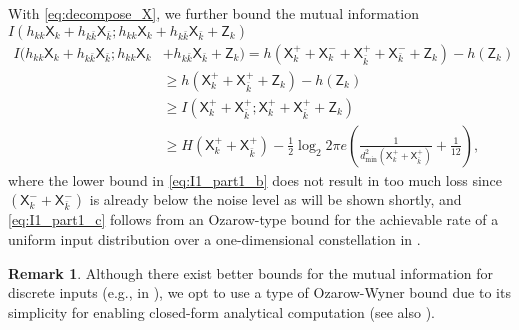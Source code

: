 \documentclass[12pt, draftclsnofoot, onecolumn]{IEEEtran}
\newcommand{\msf}[1]{\mathsf{#1}}
\theoremstyle{definition}
\newtheorem{remark}{Remark}
\begin{document}
With \eqref{eq:decompose_X}, we further bound the mutual information $I(h_{kk}\msf{X}_k+h_{k\bar{k}}\msf{X}_{\bar{k}};h_{kk}\msf{X}_k+h_{k\bar{k}}\msf{X}_{\bar{k}}+\msf{Z}_k)$
\begin{subequations}\label{eq:I1_part1}
\begin{align}
I(h_{kk}\msf{X}_k+h_{k\bar{k}}\msf{X}_{\bar{k}};h_{kk}\msf{X}_k&+h_{k\bar{k}}\msf{X}_{\bar{k}}+\msf{Z}_k)
= h(\msf{X}_k^{+}+\msf{X}_k^{-}+\msf{X}_{\bar{k}}^{+}+\msf{X}_{\bar{k}}^{-}+\msf{Z}_k)-h(\msf{Z}_k)  \\
&\geq h(\msf{X}_k^{+}+\msf{X}_{\bar{k}}^{+}+\msf{Z}_k)-h(\msf{Z}_k) \label{eq:I1_part1_b} \\
&\geq I(\msf{X}_k^{+}+\msf{X}_{\bar{k}}^{+};\msf{X}_k^{+}+\msf{X}_{\bar{k}}^{+}+\msf{Z}_k)  \\
&\geq H(\msf{X}_k^{+}+\msf{X}_{\bar{k}}^{+}) - \frac{1}{2}\log_2 2\pi e \left(\frac{1}{ d^2_{\min}(\msf{X}_k^{+}+\msf{X}_{\bar{k}}^{+})} + \frac{1}{12}\right), \label{eq:I1_part1_c}
\end{align}
\end{subequations}
where the lower bound in \eqref{eq:I1_part1_b} does not result in too much loss since $(\msf{X}_{k}^{-}+\msf{X}_{\bar{k}}^{-})$ is already below the noise level as will be shown shortly, and \eqref{eq:I1_part1_c} follows from an Ozarow-type bound \cite{ozarow90} for the achievable rate of a uniform input distribution over a one-dimensional constellation in \cite[Prop. 1]{7451210}.






\begin{remark}
Although there exist better bounds for the mutual information for discrete inputs (e.g., in \cite{7451210}), we opt to use a type of Ozarow-Wyner bound \cite{ozarow90} due to its simplicity for enabling closed-form analytical computation (see also \cite[Sec. II-A]{7451210}).
\end{remark}
\end{document}
